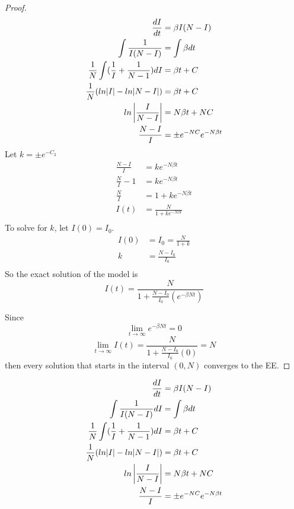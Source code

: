 \begin{proof}
\begin{align*}
    \frac{dI}{dt}                                   &= \beta I(N-I)\\
    \int\frac{1}{I(N-I)}                            &= \int\beta dt\\
    \frac{1}{N}\int (\frac{1}{I} + \frac{1}{N-1})dI &= \beta t + C\\
    \frac{1}{N}(ln|I|- ln|N-I|)                     &= \beta t + C\\
    ln\left|\frac{I}{N-I}\right|                           &= N \beta t + NC\\
    \frac{N-I}{I}                                   &= \pm e^{-NC}e^{-N\beta t}\\
\end{align*}
Let $k = \pm e^{-C_2}$\\
\begin{align*}
    \frac{N-I}{I} 	  &= ke^{-N\beta t}\\
    \frac{N}{I} - 1   &= ke^{-N\beta t}\\
    \frac{N}{I} 	  &= 1 + ke^{-N\beta t}\\
    I(t) 			  &= \frac{N}{1 + ke^{-N\beta t}}\\
\end{align*}
To solve for $k$, let $I(0) = I_0$.\\
\begin{align*}
    I(0) 	&= I_0 = \frac{N}{1 + k}\\
    k 		&= \frac{N - I_0}{I_0}\\
\end{align*}
So the exact solution of the model is
\begin{equation}
  I(t) =  \frac{N}{1+\frac{N-I_0}{I_0}(e^{-\beta N t})}
\end{equation}

Since
$$\lim_{t\to\infty} e^{-\beta N t} = 0$$
$$\lim_{t\to\infty} I(t) = \frac{N}{1 +\frac{N-I_0}{I_0}(0)} = N$$
then every solution that starts in the interval $(0, N)$ converges to the EE.
\end{proof}
      	\begin{align*}
      		\frac{dI}{dt}                                   &= \beta I(N-I)\\
      		\int\frac{1}{I(N-I)} dI                         &= \int\beta dt\\
      		\frac{1}{N}\int (\frac{1}{I} + \frac{1}{N-1})dI &= \beta t + C\\
      		\frac{1}{N}(ln|I|- ln|N-I|)                     &= \beta t + C\\
      		ln\left|\frac{I}{N-I}\right|                           &= N \beta t + NC\\
      		\frac{N-I}{I}                                   &= \pm e^{-NC}e^{-N\beta t}\\
      	\end{align*}

